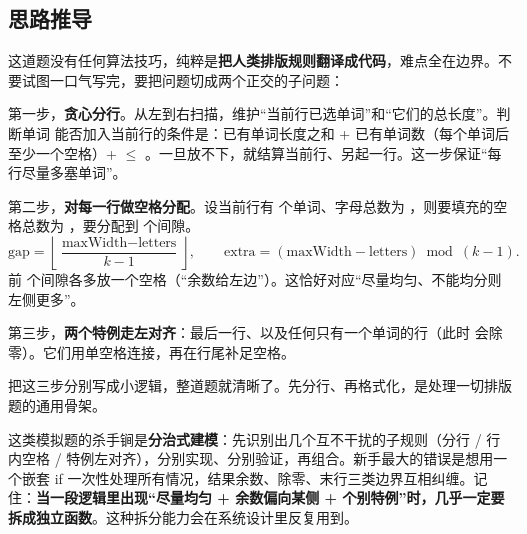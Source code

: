 \subsection*{思路推导}
这道题没有任何算法技巧，纯粹是\textbf{把人类排版规则翻译成代码}，难点全在边界。不要试图一口气写完，要把问题切成两个正交的子问题：

第一步，\textbf{贪心分行}。从左到右扫描，维护“当前行已选单词”和“它们的总长度”。判断单词  能否加入当前行的条件是：已有单词长度之和 + 已有单词数（每个单词后至少一个空格）+  $\le$ 。一旦放不下，就结算当前行、另起一行。这一步保证“每行尽量多塞单词”。

第二步，\textbf{对每一行做空格分配}。设当前行有  个单词、字母总数为 ，则要填充的空格总数为 ，要分配到  个间隙。
\[
\text{gap} = \left\lfloor \frac{\text{maxWidth}-\text{letters}}{k-1} \right\rfloor,\qquad
\text{extra} = (\text{maxWidth}-\text{letters}) \bmod (k-1).
\]
前  个间隙各多放一个空格（“余数给左边”）。这恰好对应“尽量均匀、不能均分则左侧更多”。

第三步，\textbf{两个特例走左对齐}：最后一行、以及任何只有一个单词的行（此时  会除零）。它们用单空格连接，再在行尾补足空格。

把这三步分别写成小逻辑，整道题就清晰了。先分行、再格式化，是处理一切排版题的通用骨架。

\begin{idea}
这类模拟题的杀手锏是\textbf{分治式建模}：先识别出几个互不干扰的子规则（分行 / 行内空格 / 特例左对齐），分别实现、分别验证，再组合。新手最大的错误是想用一个嵌套 if 一次性处理所有情况，结果余数、除零、末行三类边界互相纠缠。记住：\textbf{当一段逻辑里出现“尽量均匀 + 余数偏向某侧 + 个别特例”时，几乎一定要拆成独立函数}。这种拆分能力会在系统设计里反复用到。
\end{idea}

